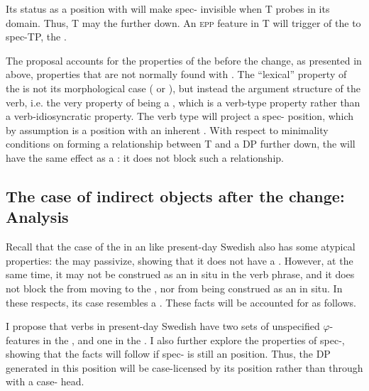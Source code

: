 \documentclass[output=paper]{langscibook}
\begin{document}
Its status as a position with  will make spec- invisible when T probes in its  domain. Thus, T may  the  further down. An \textsc{epp} feature in T will trigger  of the  to spec-TP, the .


\begin{sloppypar}
The proposal accounts for the properties of the  before the change, as presented in  above, properties that are not normally found with . The “lexical” property of the  is not its morphological case ( or ), but instead the argument structure of the verb, i.e. the very property of being a , which is a verb-type property rather than a verb-idiosyncratic property. The verb type will project a spec- position, which by assumption is a position with an inherent . With respect to minimality conditions on forming a relationship between T and a DP further down, the  will have the same effect as a : it does not block such a relationship.
\end{sloppypar}

\subsection{The case of indirect objects after the change: Analysis}\label{sec:falk:4.3}


Recall that the case of the  in an  like present-day Swedish also has some atypical properties: the  may passivize, showing that it does not have a . However, at the same time, it may not be construed as an  in situ in the verb phrase, and it does not block the  from moving to the , nor from being construed as an  in situ. In these respects, its case resembles a . These facts will be accounted for as follows. 


I propose that  verbs in present-day Swedish have two sets of unspecified $\varphi $-features in the , and one in the . I also further explore the properties of spec-, showing that the facts will follow if spec- is still an  position. Thus, the DP generated in this position will be case-licensed by its position rather than through  with a case- head.
\end{document}
